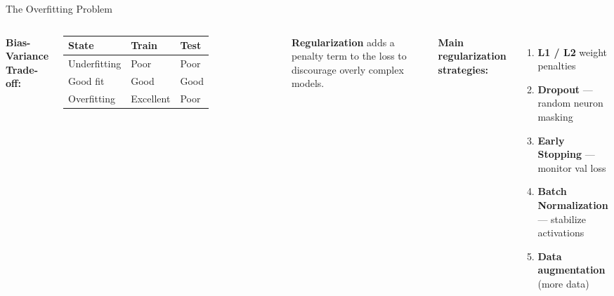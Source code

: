 \documentclass[aspectratio=169]{beamer}
\begin{document}
\begin{frame}{The Overfitting Problem}

\begin{columns}
\textbf{Bias-Variance Trade-off:}

\vspace{0.2cm}
\begin{tabular}{@{}lll@{}}
\toprule
\textbf{State} & \textbf{Train} & \textbf{Test} \\
\midrule
Underfitting & Poor & Poor \\
Good fit & Good & Good \\
Overfitting & Excellent & Poor \\
\bottomrule
\end{tabular}

\vspace{0.4cm}
\textbf{Regularization} adds a penalty term to the loss to discourage overly complex models.

\textbf{Main regularization strategies:}
\begin{enumerate}
    \item \textbf{L1 / L2} weight penalties
    \item \textbf{Dropout} --- random neuron masking
    \item \textbf{Early Stopping} --- monitor val loss
    \item \textbf{Batch Normalization} --- stabilize activations
    \item \textbf{Data augmentation} (more data)
\end{enumerate}
\end{columns}
\end{frame}
\end{document}
